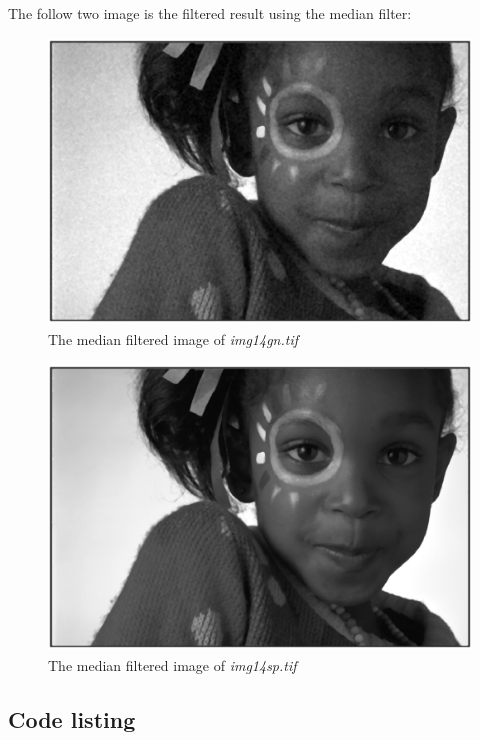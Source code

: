 \documentclass[paper=a4, fontsize=11pt]{scrartcl} %
\numberwithin{equation}{section} %
\numberwithin{figure}{section} %
\numberwithin{table}{section} %
\begin{document}
\\
\vspace{0.2in}
The follow two image is the filtered result using the median filter:
\begin{figure}[H]
	\centering
	\includegraphics[height = 3in]{gnmff.eps}
	\caption{The median filtered image of \emph{img14gn.tif}}
\end{figure}

\begin{figure}[H]
	\centering
	\includegraphics[height = 3in]{gnmf.eps}
	\caption{The median filtered image of \emph{img14sp.tif}}
\end{figure}


\subsection{Code listing}
\end{document}
